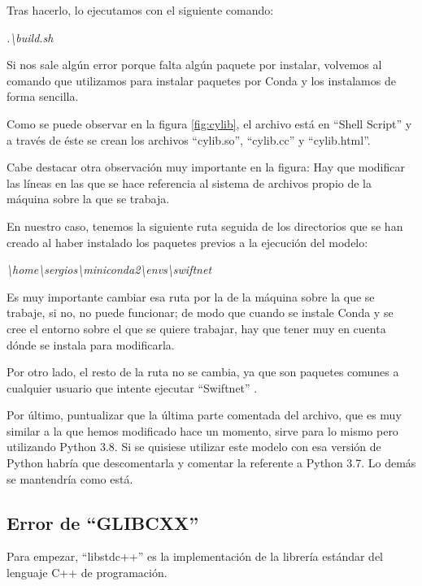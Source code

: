 Tras hacerlo, lo ejecutamos con el siguiente comando:

\begin{center}
\textit{.\textbackslash{build.sh}}
\end{center}

Si nos sale algún error porque falta algún paquete por instalar, volvemos al comando que utilizamos para instalar paquetes por Conda y los instalamos de forma sencilla.

Como se puede observar en la figura \ref{fig:cylib}, el archivo está en ``Shell Script'' \cite{shell} y a través de éste se crean los archivos ``cylib.so'', ``cylib.cc'' y ``cylib.html''.

Cabe destacar otra observación muy importante en la figura: Hay que modificar las líneas en las que se hace referencia al sistema de archivos propio de la máquina sobre la que se trabaja.

En nuestro caso, tenemos la siguiente ruta seguida de los directorios que se han creado al haber instalado los paquetes previos a la ejecución del modelo:

\begin{center}
\textit{\textbackslash{home}\textbackslash{sergios}\textbackslash{miniconda2}\textbackslash{envs}\textbackslash{swiftnet}}
\end{center}

Es muy importante cambiar esa ruta por la de la máquina sobre la que se trabaje, si no, no puede funcionar; de modo que cuando se instale Conda y se cree el entorno sobre el que se quiere trabajar, hay que tener muy en cuenta dónde se instala para modificarla.

Por otro lado, el resto de la ruta no se cambia, ya que son paquetes comunes a cualquier usuario que intente ejecutar ``Swiftnet'' \cite{swiftnet}.

Por último, puntualizar que la última parte comentada del archivo, que es muy similar a la que hemos modificado hace un momento, sirve para lo mismo pero utilizando Python 3.8. Si se quisiese utilizar este modelo con esa versión de Python habría que descomentarla y comentar la referente a Python 3.7. Lo demás se mantendría como está.

\subsection{Error de ``GLIBCXX''}

Para empezar, ``libstdc++'' \cite{glibcxx} es la implementación de la librería estándar del lenguaje C++ de programación.

